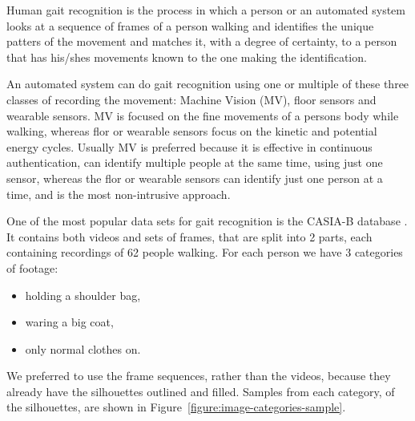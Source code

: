 \documentclass[12pt]{article}
\theoremstyle{definition}
\begin{document}
	Human gait recognition is the process in which a person or an automated system looks at a sequence of frames of a person walking and identifies the unique patters of the movement and matches it, with a degree of certainty, to a person that has his/shes movements known to the one making the identification.

	An automated system can do gait recognition using one or multiple of these three classes of recording the movement: Machine Vision (MV), floor sensors and wearable sensors. MV is focused on the fine movements of a persons body while walking, whereas flor or wearable sensors focus on the kinetic and potential energy cycles. Usually MV is preferred because it is effective in continuous authentication, can identify multiple people at the same time, using just one sensor, whereas the flor or wearable sensors can identify just one person at a time, and is the most non-intrusive approach.

	One of the most popular data sets for gait recognition is the CASIA-B database \cite{casia1}\cite{casia2}\cite{casia3}. It contains both videos and sets of frames, that are split into 2 parts, each containing recordings of 62 people walking. For each person we have 3 categories of footage:
	\begin{itemize}
		\item holding a shoulder bag,
		\item waring a big coat,
		\item only normal clothes on.
	\end{itemize} We preferred to use the frame sequences, rather than the videos, because they already have the silhouettes outlined and filled. Samples from each category, of the silhouettes, are shown in Figure~\ref{figure:image-categories-sample}.
\end{document}
